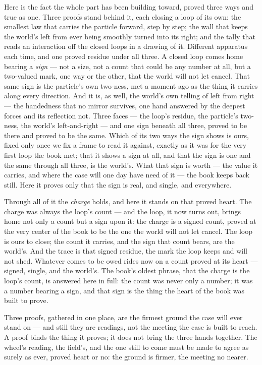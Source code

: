 Here is the fact the whole part has been building toward, proved three ways and true as one. Three proofs stand
behind it, each closing a loop of its own: the smallest law that carries the particle forward, step by step; the
wall that keeps the world's left from ever being smoothly turned into its right; and the tally that reads an
interaction off the closed loops in a drawing of it. Different apparatus each time, and one proved residue under
all three. A closed loop comes
home bearing a \emph{sign} --- not a size, not a count that could be any number at all, but a two-valued mark,
one way or the other, that the world will not let cancel. That same sign is the particle's own two-ness, met a
moment ago as the thing it carries along every direction. And it is, as well, the world's own telling of left
from right --- the handedness that no mirror survives, one hand answered by the deepest forces and its
reflection not. Three faces --- the loop's residue, the particle's two-ness, the world's left-and-right --- and
one sign beneath all three, proved to be there and proved to be the same. Which of its two ways the sign shows
is ours, fixed only once we fix a frame to read it against, exactly as it was for the very first loop the book
met; that it shows a sign at all, and that the sign is one and the same through all three, is the world's. What
that sign is worth --- the value it carries, and where the case will one day have need of it --- the book keeps
back still. Here it proves only that the sign is real, and single, and everywhere.

Through all of it the \emph{charge} holds, and here it stands on that proved heart. The charge was always the
loop's count --- and the loop, it now turns out, brings home not only a count but a sign upon it: the charge is
a signed count, proved at the very center of the book to be the one the world will not let cancel. The loop is
ours to close; the count it carries, and the sign that count bears, are the world's. And the trace is that
signed residue, the mark the loop keeps and will not shed. Whatever comes to be owed rides now on a count proved
at its heart --- signed, single, and the world's. The book's oldest phrase, that the charge is the loop's count,
is answered here in full: the count was never only a number; it was a number bearing a sign, and that sign is
the thing the heart of the book was built to prove.

Three proofs, gathered in one place, are the firmest ground the case will ever stand on --- and still they are
readings, not the meeting the case is built to reach. A proof binds the thing it proves; it does not bring the
three hands together. The wheel's reading, the field's, and the one still to come must be made to agree as
surely as ever, proved heart or no: the ground is firmer, the meeting no nearer.

